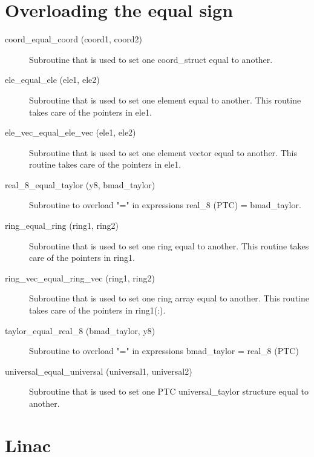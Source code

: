 \section{Overloading the equal sign}
\label{r:equal}    

\begin{description}

\item[coord\_equal\_coord (coord1, coord2)] \Newline
Subroutine that is used to set one coord\_struct equal to another. 

\item[ele\_equal\_ele (ele1, ele2)] \Newline
Subroutine that is used to set one element equal to another. 
This routine takes care of the pointers in ele1. 

\item[ele\_vec\_equal\_ele\_vec (ele1, ele2)] \Newline
Subroutine that is used to set one element vector equal to another. 
This routine takes care of the pointers in ele1. 

\item[real\_8\_equal\_taylor (y8, bmad\_taylor)] \Newline
Subroutine to overload "=" in expressions real\_8 (PTC) = bmad\_taylor.

\item[ring\_equal\_ring (ring1, ring2)] \Newline
Subroutine that is used to set one ring equal to another. 
This routine takes care of the pointers in ring1. 

\item[ring\_vec\_equal\_ring\_vec (ring1, ring2)] \Newline
Subroutine that is used to set one ring array equal to another. 
This routine takes care of the pointers in ring1(:). 

\item[taylor\_equal\_real\_8 (bmad\_taylor, y8)] \Newline
Subroutine to overload "=" in expressions bmad\_taylor = real\_8 (PTC) 

\item[universal\_equal\_universal (universal1, universal2)] \Newline
Subroutine that is used to set one PTC universal\_taylor 
structure equal to another. 

\end{description}

\section{Linac}
\label{r:linac}    


